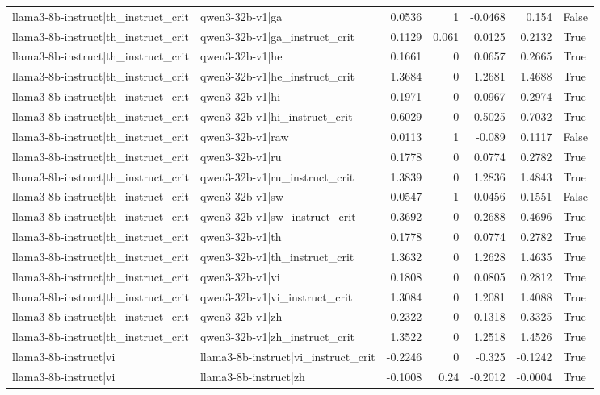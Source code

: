 \begin{table}
\begin{tabular}{l l r r r r l}
llama3-8b-instruct|th_instruct_crit & qwen3-32b-v1|ga & 0.0536 & 1 & -0.0468 & 0.154 & False \\
llama3-8b-instruct|th_instruct_crit & qwen3-32b-v1|ga_instruct_crit & 0.1129 & 0.061 & 0.0125 & 0.2132 & True \\
llama3-8b-instruct|th_instruct_crit & qwen3-32b-v1|he & 0.1661 & 0 & 0.0657 & 0.2665 & True \\
llama3-8b-instruct|th_instruct_crit & qwen3-32b-v1|he_instruct_crit & 1.3684 & 0 & 1.2681 & 1.4688 & True \\
llama3-8b-instruct|th_instruct_crit & qwen3-32b-v1|hi & 0.1971 & 0 & 0.0967 & 0.2974 & True \\
llama3-8b-instruct|th_instruct_crit & qwen3-32b-v1|hi_instruct_crit & 0.6029 & 0 & 0.5025 & 0.7032 & True \\
llama3-8b-instruct|th_instruct_crit & qwen3-32b-v1|raw & 0.0113 & 1 & -0.089 & 0.1117 & False \\
llama3-8b-instruct|th_instruct_crit & qwen3-32b-v1|ru & 0.1778 & 0 & 0.0774 & 0.2782 & True \\
llama3-8b-instruct|th_instruct_crit & qwen3-32b-v1|ru_instruct_crit & 1.3839 & 0 & 1.2836 & 1.4843 & True \\
llama3-8b-instruct|th_instruct_crit & qwen3-32b-v1|sw & 0.0547 & 1 & -0.0456 & 0.1551 & False \\
llama3-8b-instruct|th_instruct_crit & qwen3-32b-v1|sw_instruct_crit & 0.3692 & 0 & 0.2688 & 0.4696 & True \\
llama3-8b-instruct|th_instruct_crit & qwen3-32b-v1|th & 0.1778 & 0 & 0.0774 & 0.2782 & True \\
llama3-8b-instruct|th_instruct_crit & qwen3-32b-v1|th_instruct_crit & 1.3632 & 0 & 1.2628 & 1.4635 & True \\
llama3-8b-instruct|th_instruct_crit & qwen3-32b-v1|vi & 0.1808 & 0 & 0.0805 & 0.2812 & True \\
llama3-8b-instruct|th_instruct_crit & qwen3-32b-v1|vi_instruct_crit & 1.3084 & 0 & 1.2081 & 1.4088 & True \\
llama3-8b-instruct|th_instruct_crit & qwen3-32b-v1|zh & 0.2322 & 0 & 0.1318 & 0.3325 & True \\
llama3-8b-instruct|th_instruct_crit & qwen3-32b-v1|zh_instruct_crit & 1.3522 & 0 & 1.2518 & 1.4526 & True \\
llama3-8b-instruct|vi & llama3-8b-instruct|vi_instruct_crit & -0.2246 & 0 & -0.325 & -0.1242 & True \\
llama3-8b-instruct|vi & llama3-8b-instruct|zh & -0.1008 & 0.24 & -0.2012 & -0.0004 & True \\

\end{tabular}
\end{table}
